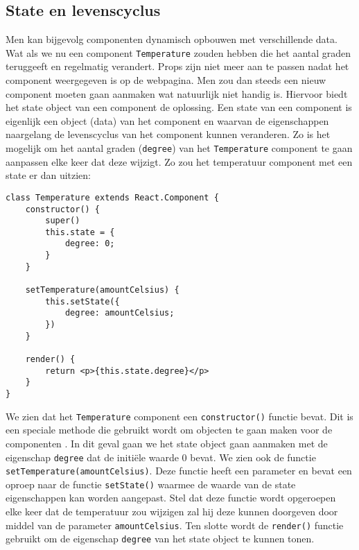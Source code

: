 \subsection{State en levenscyclus}
\label{subsec:state-en-levenscyclus}
Men kan bijgevolg componenten dynamisch opbouwen met verschillende data. Wat als we nu een component \lstinline[basicstyle=\ttfamily\color{red}]|Temperature| zouden hebben die het aantal graden teruggeeft en regelmatig verandert. Props zijn niet meer aan te passen nadat het component weergegeven is op de webpagina. Men zou dan steeds een nieuw component moeten gaan aanmaken wat natuurlijk niet handig is. Hiervoor biedt het state object van een component de oplossing. Een state van een component is eigenlijk een object (data) van het component en waarvan de eigenschappen naargelang de levenscyclus van het component kunnen veranderen. Zo is het mogelijk om het aantal graden (\lstinline[basicstyle=\ttfamily\color{red}]|degree|) van het \lstinline[basicstyle=\ttfamily\color{red}]|Temperature| component te gaan aanpassen elke keer dat deze wijzigt. Zo zou het temperatuur component met een state er dan uitzien:

\begin{lstlisting}[frame=single, caption=Het temperature component met de bijhorende state.]
class Temperature extends React.Component {
	constructor() {
		super()
		this.state = {
			degree: 0;
		}
	}
	
	setTemperature(amountCelsius) {
		this.setState({
			degree: amountCelsius;
		})
	}

	render() {
		return <p>{this.state.degree}</p>
	}
}
\end{lstlisting}

We zien dat het \lstinline[basicstyle=\ttfamily\color{red}]|Temperature| component een \lstinline[basicstyle=\ttfamily\color{red}]|constructor()| functie bevat. Dit is een speciale methode die gebruikt wordt om objecten te gaan maken voor de componenten \autocite{Chima2017}. In dit geval gaan we het state object gaan aanmaken met de eigenschap \lstinline[basicstyle=\ttfamily\color{red}]|degree| dat de initiële waarde 0 bevat. We zien ook de functie \lstinline[basicstyle=\ttfamily\color{red}]|setTemperature(amountCelsius)|. Deze functie heeft een parameter en bevat een oproep naar de functie \lstinline[basicstyle=\ttfamily\color{red}]|setState()| waarmee de waarde van de state eigenschappen kan worden aangepast. Stel dat deze functie wordt opgeroepen elke keer dat de temperatuur zou wijzigen zal hij deze kunnen doorgeven door middel van de parameter \lstinline[basicstyle=\ttfamily\color{red}]|amountCelsius|. Ten slotte wordt de \lstinline[basicstyle=\ttfamily\color{red}]|render()| functie gebruikt om de eigenschap \lstinline[basicstyle=\ttfamily\color{red}]|degree|
van het state object te kunnen tonen.


